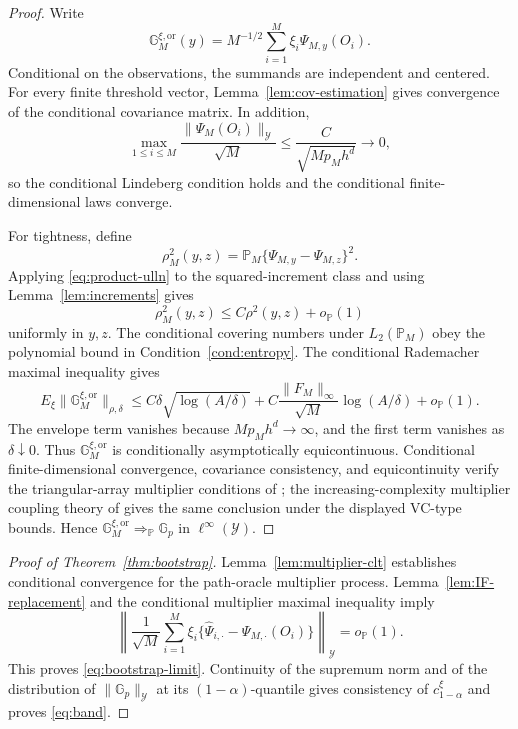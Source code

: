 \begin{proof}
Write
\[
\mathbb G_M^{\xi,\mathrm{or}}(y)
=
M^{-1/2}\sum_{i=1}^M\xi_i\Psi_{M,y}(O_i).
\]
Conditional on the observations, the summands are independent and centered. For every finite threshold vector, Lemma~\ref{lem:cov-estimation} gives convergence of the conditional covariance matrix. In addition,
\[
\max_{1\le i\le M}
\frac{\|\Psi_M(O_i)\|_{\mathcal Y}}{\sqrt M}
\le
\frac{C}{\sqrt{Mp_Mh^d}}
\to0,
\]
so the conditional Lindeberg condition holds and the conditional finite-dimensional laws converge.

For tightness, define
\[
\rho_M^2(y,z)
=
\mathbb P_M\{\Psi_{M,y}-\Psi_{M,z}\}^2.
\]
Applying \eqref{eq:product-ulln} to the squared-increment class and using Lemma~\ref{lem:increments} gives
\begin{equation}
\rho_M^2(y,z)
\le
C\rho^2(y,z)+o_{\mathbb P}(1)
\label{eq:empirical-metric-control}
\end{equation}
uniformly in \(y,z\). The conditional covering numbers under \(L_2(\mathbb P_M)\) obey the polynomial bound in Condition~\ref{cond:entropy}. The conditional Rademacher maximal inequality gives
\begin{equation}
E_\xi\|\mathbb G_M^{\xi,\mathrm{or}}\|_{\rho,\delta}
\le
C\delta\sqrt{\log(A/\delta)}
+
C\frac{\|F_M\|_\infty}{\sqrt M}\log(A/\delta)
+o_{\mathbb P}(1).
\label{eq:conditional-maximal}
\end{equation}
The envelope term vanishes because \(Mp_Mh^d\to\infty\), and the first term vanishes as \(\delta\downarrow0\). Thus \(\mathbb G_M^{\xi,\mathrm{or}}\) is conditionally asymptotically equicontinuous. Conditional finite-dimensional convergence, covariance consistency, and equicontinuity verify the triangular-array multiplier conditions of \citet{Kosorok2003}; the increasing-complexity multiplier coupling theory of \citet{ChernozhukovChetverikovKato2016} gives the same conclusion under the displayed VC-type bounds. Hence \(\mathbb G_M^{\xi,\mathrm{or}}\Rightarrow_{\mathbb P}\mathbb G_p\) in \(\ell^\infty(\mathcal Y)\).
\end{proof}

\begin{proof}[Proof of Theorem~\ref{thm:bootstrap}]
Lemma~\ref{lem:multiplier-clt} establishes conditional convergence for the path-oracle multiplier process. Lemma~\ref{lem:IF-replacement} and the conditional multiplier maximal inequality imply
\[
\left\|
\frac1{\sqrt M}
\sum_{i=1}^M\xi_i
\{\widehat\Psi_{i,\cdot}-\Psi_{M,\cdot}(O_i)\}
\right\|_{\mathcal Y}
=o_{\mathbb P}(1).
\]
This proves \eqref{eq:bootstrap-limit}. Continuity of the supremum norm and of the distribution of \(\|\mathbb G_p\|_{\mathcal Y}\) at its \((1-\alpha)\)-quantile gives consistency of \(c_{1-\alpha}^\xi\) and proves \eqref{eq:band}.
\end{proof}

